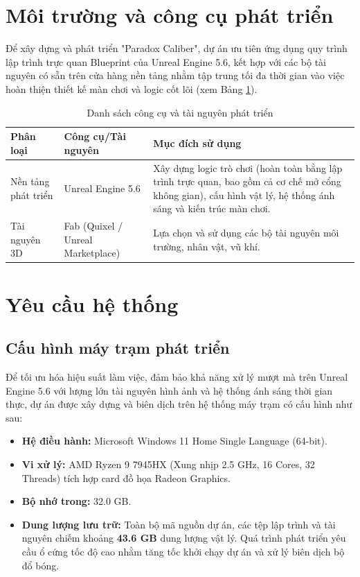 \documentclass[../DoAn.tex]{subfiles}
\begin{document}
\section{Môi trường và công cụ phát triển}
Để xây dựng và phát triển "Paradox Caliber", dự án ưu tiên ứng dụng quy trình lập trình trực quan Blueprint của Unreal Engine 5.6, kết hợp với các bộ tài nguyên có sẵn trên cửa hàng nền tảng nhằm tập trung tối đa thời gian vào việc hoàn thiện thiết kế màn chơi và logic cốt lõi (xem Bảng \ref{table:tools_used}).

\begin{table}[!htbp]
\centering{}
    \begin{tabular}{|l|l|p{6cm}|}
        \hline
        \textbf{Phân loại} & \textbf{Công cụ/Tài nguyên} & \textbf{Mục đích sử dụng} \\ \hline
        Nền tảng phát triển & Unreal Engine 5.6 & Xây dựng logic trò chơi (hoàn toàn bằng lập trình trực quan, bao gồm cả cơ chế mở cổng không gian), cấu hình vật lý, hệ thống ánh sáng và kiến trúc màn chơi.\\ \hline
        Tài nguyên 3D & Fab (Quixel / Unreal Marketplace) & Lựa chọn và sử dụng các bộ tài nguyên môi trường, nhân vật, vũ khí.  \\ \hline
        \end{tabular}
    \caption{Danh sách công cụ và tài nguyên phát triển}
    \label{table:tools_used}
\end{table}

\section{Yêu cầu hệ thống}
\subsection{Cấu hình máy trạm phát triển}
Để tối ưu hóa hiệu suất làm việc, đảm bảo khả năng xử lý mượt mà trên Unreal Engine 5.6 với lượng lớn tài nguyên hình ảnh và hệ thống ánh sáng thời gian thực, dự án được xây dựng và biên dịch trên hệ thống máy trạm có cấu hình như sau:
\begin{itemize}
    \item \textbf{Hệ điều hành:} Microsoft Windows 11 Home Single Language (64-bit).
    \item \textbf{Vi xử lý:} AMD Ryzen 9 7945HX (Xung nhịp 2.5 GHz, 16 Cores, 32 Threads) tích hợp card đồ họa Radeon Graphics.
    \item \textbf{Bộ nhớ trong:} 32.0 GB.
    \item \textbf{Dung lượng lưu trữ:} Toàn bộ mã nguồn dự án, các tệp lập trình và tài nguyên chiếm khoảng \textbf{43.6 GB} dung lượng vật lý. Quá trình phát triển yêu cầu ổ cứng tốc độ cao nhằm tăng tốc khởi chạy dự án và xử lý biên dịch bộ đổ bóng.
\end{itemize}
\end{document}
